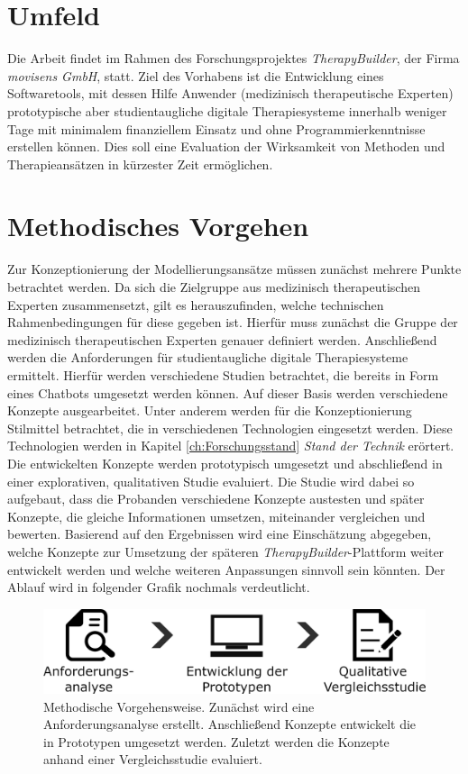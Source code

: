 \section{Umfeld}

Die Arbeit findet im Rahmen des Forschungsprojektes \emph{TherapyBuilder}, der Firma \emph{movisens GmbH}, statt. Ziel des Vorhabens ist die Entwicklung eines Softwaretools, mit dessen Hilfe Anwender (medizinisch therapeutische Experten) prototypische aber studientaugliche digitale Therapiesysteme innerhalb weniger Tage mit minimalem finanziellem Einsatz und ohne Programmierkenntnisse erstellen können. Dies soll eine Evaluation der Wirksamkeit von Methoden und Therapieansätzen in kürzester Zeit ermöglichen.


\section{Methodisches Vorgehen}

Zur Konzeptionierung der Modellierungsansätze müssen zunächst mehrere Punkte betrachtet werden. Da sich die Zielgruppe aus medizinisch therapeutischen Experten zusammensetzt, gilt es herauszufinden, welche technischen Rahmenbedingungen für diese gegeben ist. Hierfür muss zunächst die Gruppe der medizinisch therapeutischen Experten genauer definiert werden. Anschließend werden die Anforderungen für studientaugliche digitale Therapiesysteme ermittelt. Hierfür werden verschiedene Studien betrachtet, die bereits in Form eines Chatbots umgesetzt werden können. Auf dieser Basis werden verschiedene Konzepte ausgearbeitet. Unter anderem werden für die Konzeptionierung Stilmittel betrachtet, die in verschiedenen Technologien eingesetzt werden. Diese Technologien werden in Kapitel \ref{ch:Forschungsstand} \emph{Stand der Technik} erörtert. Die entwickelten Konzepte werden prototypisch umgesetzt und abschließend in einer explorativen, qualitativen Studie evaluiert. Die Studie wird dabei so aufgebaut, dass die Probanden verschiedene Konzepte austesten und später Konzepte, die gleiche Informationen umsetzen, miteinander vergleichen und bewerten. Basierend auf den Ergebnissen wird eine Einschätzung abgegeben, welche Konzepte zur Umsetzung der späteren \emph{TherapyBuilder}-Plattform weiter entwickelt werden und welche weiteren Anpassungen sinnvoll sein könnten. Der Ablauf wird in folgender Grafik nochmals verdeutlicht.

\begin{figure}[h]
\centering
\includegraphics[width=1\textwidth]{pictures/ablauf}
\caption{Methodische Vorgehensweise. Zunächst wird eine Anforderungsanalyse erstellt. Anschließend Konzepte entwickelt die in Prototypen umgesetzt werden. Zuletzt werden die Konzepte anhand einer Vergleichsstudie evaluiert.}
\label{methode}
\end{figure}

